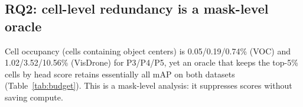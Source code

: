 \documentclass[a4paper,fleqn]{cas-dc}
\begin{document}
\subsection{RQ2: cell-level redundancy is a mask-level oracle}
Cell occupancy (cells containing object centers) is 0.05/0.19/0.74\% (VOC) and 1.02/3.52/10.56\% (VisDrone) for P3/P4/P5, yet an oracle that keeps the top-5\% cells by head score retains essentially all mAP on both datasets (Table~\ref{tab:budget}). This is a mask-level analysis: it suppresses scores without saving compute.
\begin{table}[h]\centering\footnotesize
\caption{Budget curves (mAP50-95, mask-level): an oracle ranking cells by the model's own head scores retains essentially all mAP at 5\% of cells; the self-distilled gate is within 0.5\,pp of full accuracy at 10\% budget (VOC: 0.5852 vs.\ 0.5899; VisDrone: 0.1719 vs.\ 0.1725) and 1.1\,pp at 5\%; the energy gate degrades much more on dense VisDrone. Full 5--75\% curves and YOLO26s/26m ablations are in the supplementary material; these numbers assume full features (real skipping: Table~\ref{tab:blockskip}).}
\label{tab:budget}

\end{table}
\end{document}
